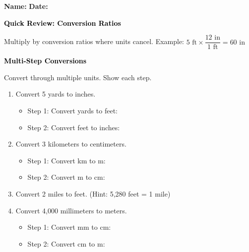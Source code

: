 \documentclass[12pt, letterpaper, fleqn]{article}
\newcommand{\blank}{\underline{\hspace{2.2cm}}}
\begin{document}
\textbf{Name:} \underline{\hspace{5cm}}
\hfill
\textbf{Date:} \underline{\hspace{3cm}}\\

\begin{tcolorbox}[colback=customteal!20]
    \large\textcolor{black}{\textbf{Quick Review: Conversion Ratios}}
\end{tcolorbox}

\vspace{3mm}

\noindent
Multiply by conversion ratios where units cancel. Example: $5 \text{ ft} \times \dfrac{12 \text{ in}}{1 \text{ ft}} = 60 \text{ in}$

\vspace{4mm}

\begin{tcolorbox}[colback=customteal!20]
\large\textcolor{black}{\textbf{Multi-Step Conversions}}
\end{tcolorbox}

\noindent
Convert through multiple units. Show each step.

\vspace{3mm}

\begin{enumerate}[itemsep=1.6cm, leftmargin=0.6cm]

\item Convert 5 yards to inches.
\begin{itemize}
    \item Step 1: Convert yards to feet: \blank
    \item Step 2: Convert feet to inches: \blank
\end{itemize}

\item Convert 3 kilometers to centimeters.
\begin{itemize}
    \item Step 1: Convert km to m: \blank
    \item Step 2: Convert m to cm: \blank
\end{itemize}

\item Convert 2 miles to feet. (Hint: 5,280 feet = 1 mile)

\vspace{1.3cm}

\item Convert 4,000 millimeters to meters.
\begin{itemize}
    \item Step 1: Convert mm to cm: \blank
    \item Step 2: Convert cm to m: \blank
\end{itemize}

\end{enumerate}
\end{document}
